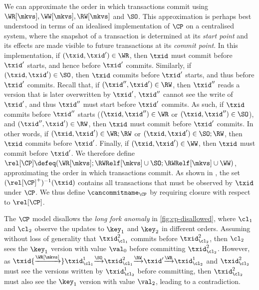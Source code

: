 We can approximate the order in which transactions 
commit using \(\WR[\mkvs], \allowbreak \WW[\mkvs], \allowbreak \RW[\mkvs]\) and \(\SO\). 
This approximation is perhaps best understood in terms of an idealised implementation of \(\CP\) on a centralised system,
where the snapshot of a transaction is determined at its \emph{start point} and its effects are made visible to future transactions at its \emph{commit point}.
In this implementation, if \((\txid,\txid') \in \WR\), then 
\(\txid\) must commit before \(\txid'\) starts, and hence before \(\txid'\) commits.
Similarly, if \((\txid,\txid') \in \SO\), then \(\txid\) commits before \(\txid'\) starts, 
and thus before \(\txid'\) commits.
Recall that, if \((\txid'', \txid') \in \RW\),
then \(\txid''\) reads a version that is later overwritten by
\(\txid'\), \ie \(\txid''\) cannot see the write of \(\txid'\), and thus \(\txid''\) must start before 
\(\txid'\) commits. 
As such, if \(\txid\) commits before \(\txid''\) starts 
(\((\txid, \txid'') \in \WR\) or \((\txid,\txid'') \in \SO\)), 
and \((\txid'', \txid') \in \RW\), then \(\txid\) must commit before 
\(\txid'\) commits. 
In other words, if \((\txid,\txid') \in \WR;\RW\) or \((\txid,\txid') \in \SO;\RW\), then \(\txid\) commits before \(\txid'\).
Finally, if \((\txid,\txid') \in\WW\), then \(\txid\) must commit before \(\txid'\). 
We therefore define \(\rel[\CP] \defeq (\WR[\mkvs]; \RWRelf[\mkvs] \cup \SO;  \RWRelf[\mkvs] \cup \WW)\), approximating the order in which transactions commit. 
%
As shown in \citet{laws}, the set \((\rel[\CP]^{+})^{-1}(\txid)\) contains all transactions that must be observed by \(\txid\) under \(\CP\). 
We thus define \(\cancommitname_{\CP}\) by requiring closure with
respect to \(\rel[\CP]\).

The $\CP$ model disallows the \emph{long fork anomaly} in \cref{fig:cp-disallowed}, where \(\cl_1\) and \(\cl_2\) observe the updates to \(\key_1\) and \(\key_2\) 
in different orders. 
Assuming without loss of generality that \( \txid_{\cl_1}^{2} \) commits 
before \( \txid_{\cl_2}^{2} \), then \(\cl_2\) sees the \(\key_1\) version with value \(\val_0\) before committing \( \txid_{\cl_2}^{2} \). 
However, as \(\txid {\xrightarrow{\!\WR[\mkvs]\!}} \txid_{\cl_{1}}^{1} 
{\xrightarrow{\!\SO\!}} \txid_{\cl_{1}}^{2} {\xrightarrow{\!\RW\!}} \txid' {\xrightarrow{\!\WR\!}} \txid_{\cl_{2}}^{1} \)
and \( \txid_{\cl_2}^{2} \) must see the versions written by \( \txid_{\cl_2}^{1} \) before committing,
then \( \txid_{\cl_2}^{2} \) must also see the \(\key_1\) version with 
value \(\val_2\), leading to a contradiction.

